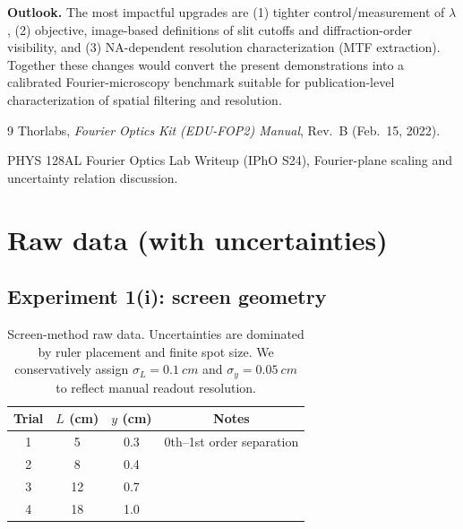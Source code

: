 \documentclass[10pt,twocolumn]{article}
\begin{document}
\textbf{Outlook.} The most impactful upgrades are (1) tighter control/measurement of $\lambda$, (2) objective, image-based definitions of slit cutoffs and diffraction-order visibility, and (3) NA-dependent resolution characterization (MTF extraction). Together these changes would convert the present demonstrations into a calibrated Fourier-microscopy benchmark suitable for publication-level characterization of spatial filtering and resolution.

\begin{thebibliography}{9}
Thorlabs, \emph{Fourier Optics Kit (EDU-FOP2) Manual}, Rev.\ B (Feb.\ 15, 2022).

PHYS 128AL Fourier Optics Lab Writeup (IPhO S24), Fourier-plane scaling and uncertainty relation discussion.
\end{thebibliography}

\clearpage
\onecolumn
\appendix

\section{Raw data (with uncertainties)}
\label{app:raw}
\subsection{Experiment 1(i): screen geometry}
\begin{table}[H]
\centering
\caption{Screen-method raw data. Uncertainties are dominated by ruler placement and finite spot size. We conservatively assign $\sigma_L=\SI{0.1}{cm}$ and $\sigma_y=\SI{0.05}{cm}$ to reflect manual readout resolution.}
\label{tab:screenraw}
\begin{tabular}{@{}cccc@{}}
\toprule
Trial & $L$ (cm) & $y$ (cm) & Notes \\ \midrule
1 & 5  & 0.3 & 0th--1st order separation \\
2 & 8  & 0.4 & \\
3 & 12 & 0.7 & \\
4 & 18 & 1.0 & \\ \bottomrule
\end{tabular}
\end{table}
\end{document}
